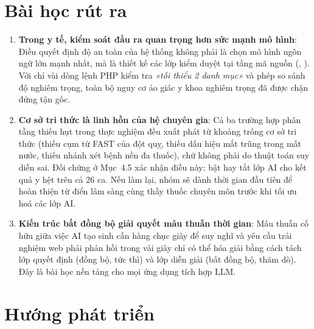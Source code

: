 \section{Bài học rút ra}

\begin{enumerate}[leftmargin=1.6em, itemsep=2pt]
  \item \textbf{Trong y tế, kiểm soát đầu ra quan trọng hơn sức mạnh mô hình}:
        Điều quyết định độ an toàn của hệ thống không phải là chọn mô hình ngôn
        ngữ lớn mạnh nhất, mà là thiết kế các lớp kiểm duyệt tại tầng mã nguồn
        (, ). Với chỉ vài dòng lệnh PHP kiểm
        tra \emph{«tối thiểu 2 danh mục»} và phép so sánh độ nghiêm trọng, toàn
        bộ nguy cơ ảo giác y khoa nghiêm trọng đã được chặn đứng tận gốc.
  \item \textbf{Cơ sở tri thức là linh hồn của hệ chuyên gia}: Cả ba trường hợp
        phân tầng thiếu hụt trong thực nghiệm đều xuất phát từ khoảng trống cơ
        sở tri thức (thiếu cụm từ FAST của đột quỵ, thiếu dấu hiệu mắt trũng
        trong mất nước, thiếu nhánh xét bệnh nền đa thuốc), chứ không phải do
        thuật toán suy diễn sai. Đối chứng ở Mục~4.5 xác nhận điều này: bật hay
        tắt lớp AI cho kết quả y hệt trên cả 26 ca. Nếu làm lại, nhóm sẽ dành
        thời gian đầu tiên để hoàn thiện từ điển lâm sàng cùng thầy thuốc chuyên
        môn trước khi tối ưu hoá các lớp AI.
  \item \textbf{Kiến trúc bất đồng bộ giải quyết mâu thuẫn thời gian}: Mâu thuẫn
        cố hữu giữa việc AI tạo sinh cần hàng chục giây để suy nghĩ và yêu cầu
        trải nghiệm web phải phản hồi trong vài giây chỉ có thể hóa giải bằng
        cách tách lớp quyết định (đồng bộ, tức thì) và lớp diễn giải (bất đồng
        bộ, thăm dò). Đây là bài học nền tảng cho mọi ứng dụng tích hợp LLM.
\end{enumerate}

\section{Hướng phát triển}


